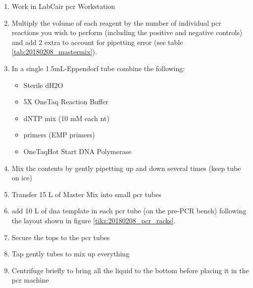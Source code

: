 \begin{enumerate}
\item Work in LabCair \gls{pcr} Workstation
\item Multiply the volume of each reagent by the number of individual \gls{pcr} reactions you wish to perform (including the positive and negative controls) and add 2 extra to account for pipetting error (see table \ref{tab:20180208_mastermix}).
\item In a single 1.5mL-Eppendorf tube combine the following:
	\begin{itemize}
	\item Sterile dH2O
	\item 5X OneTaq Reaction Buffer
	\item dNTP mix (10 mM each nt)
	\item primers (EMP primers)
	\item OneTaq\cR Hot Start DNA Polymerase
	\end{itemize}
\item Mix the contents by gently pipetting up and down several times (keep tube on ice)
\item Transfer  15 \textmu L of Master Mix into small \gls{pcr} tubes
\item add 10 \textmu L of \gls{dna} template in each \gls{pcr} tube (on the pre-PCR bench) following the layout shown in figure \ref{tikz:20180208_pcr_racks}.
\item Secure the tops to the \gls{pcr} tubes
\item Tap gently tubes to mix up everything
\item Centrifuge briefly to bring all the liquid to the bottom before placing it in the \gls{pcr} machine
\end{enumerate}

